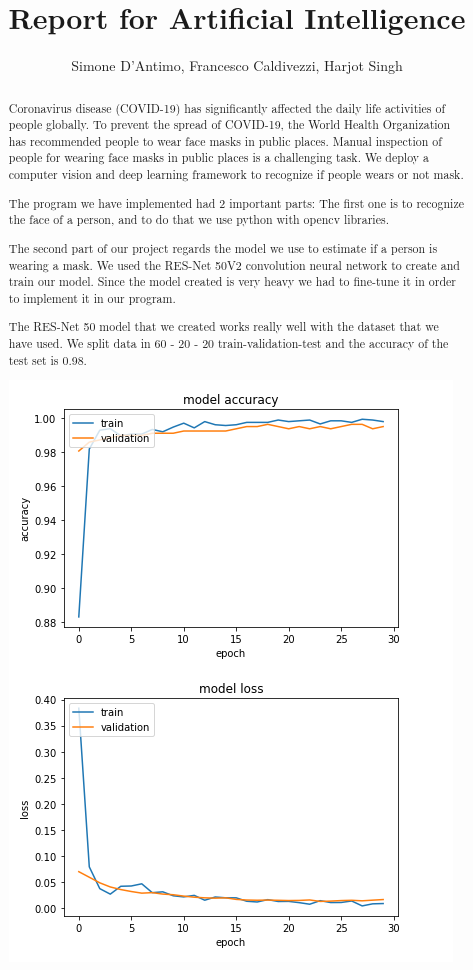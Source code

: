 \documentclass[]{article}
\title{ Report for Artificial Intelligence }
\author{ Simone D'Antimo, Francesco Caldivezzi, Harjot Singh}
\begin{document}
\maketitle

\begin{abstract}
Coronavirus disease (COVID-19) has significantly affected the daily life activities of people globally.
To prevent the spread of COVID-19, the World Health Organization has recommended people to wear face masks in public places.
Manual inspection of people for wearing face masks in public places is a challenging task.  We deploy a
computer vision and deep learning framework to recognize if people wears or not mask.

The program we have implemented had 2 important parts: 
The first one is to recognize the face of a person, and to do that we use python with opencv libraries.

The second part of our project regards the model we use to estimate if a person is wearing a mask. We used the RES-Net 50V2 convolution neural network to create and train our model. Since the model created is very heavy we had to fine-tune it in order to implement it in our program.

The RES-Net 50 model that we created works really well with the dataset that we have used. We split data in 60 - 20 - 20 train-validation-test and the accuracy of the test set is 0.98.

\includegraphics{LossAndAccuracy}


\end{abstract}
\end{document}
